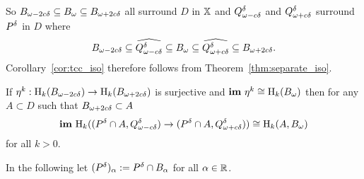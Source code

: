 So $\b\subseteq \B\subseteq \BB$ all surround $D$ in $\X$ and $\Q^\of$ and $\QQ^\of$ surround $P^\of$ in $D$ where
\[ \b\subseteq \ext{\Q^\of}\subseteq \B\subseteq \ext{\QQ^\of}\subseteq \BB.\]
Corollary~\ref{cor:tcc_iso} therefore follows from Theorem~\ref{thm:separate_iso}.

\begin{corollary}\label{cor:tcc_iso}
  If $\eta^k : \hom_k(\b)\to \hom_k(\BB)$ is surjective and $\im~\eta^k\cong \hom_k(\bb)$ then for any $A\subset D$ such that $\BB\subset A$
  \[ \im~\hom_k((\P\cap A, \Q^\of)\to (\P\cap A, \QQ^\of))\cong \hom_k(A, \bb)\]
  for all $k > 0$.
\end{corollary}


In the following let $(\P)_\alpha := \P\cap B_\alpha$ for all $\alpha\in\R$.

